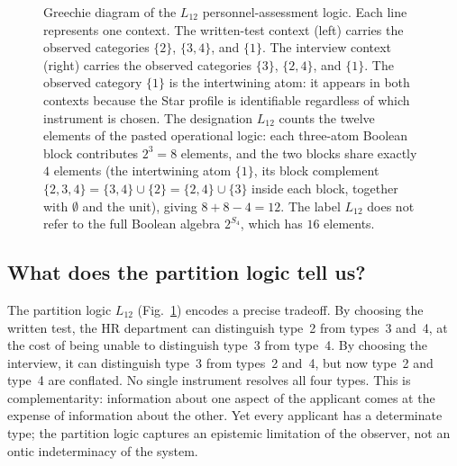 \documentclass[aps,pra,twocolumn,superscriptaddress,floatfix,longbibliography]{revtex4-2}
\begin{document}
\begin{figure}[t]
\centering
{}
\caption{Greechie diagram of the $L_{12}$ personnel-assessment
logic. Each line represents one context. The written-test context
(left) carries the observed categories $\{2\}$, $\{3,4\}$, and
$\{1\}$. The interview context (right) carries the observed
categories $\{3\}$, $\{2,4\}$, and $\{1\}$. The observed category
$\{1\}$ is the intertwining atom: it appears in both contexts
because the Star profile is identifiable regardless of which
instrument is chosen. The designation $L_{12}$ counts the
twelve elements of the pasted operational logic: each three-atom
Boolean block contributes $2^3=8$ elements, and the two blocks
share exactly $4$ elements (the intertwining atom $\{1\}$, its
block complement $\{2,3,4\}=\{3,4\}\cup\{2\}=\{2,4\}\cup\{3\}$
inside each block, together with $\emptyset$ and the unit), giving
$8+8-4=12$. The label $L_{12}$ does not refer to the full Boolean
algebra $2^{S_4}$, which has $16$ elements.}
\label{fig:L12}
\end{figure}

\subsection{What does the partition logic tell us?}

The partition logic $L_{12}$ (Fig.~\ref{fig:L12}) encodes a precise
tradeoff. By choosing the written test, the HR department can
distinguish type~2 from types~3 and~4, at the cost of being unable
to distinguish type~3 from type~4. By choosing the interview, it can
distinguish type~3 from types~2 and~4, but now type~2 and type~4 are
conflated. No single instrument resolves all four types. This is
complementarity: information about one aspect of the applicant comes
at the expense of information about the other. Yet every applicant
has a determinate type; the partition logic captures an epistemic
limitation of the observer, not an ontic indeterminacy of the system.
\end{document}
